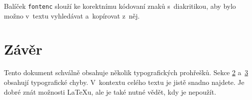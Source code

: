 \documentclass[twocolumn]{article}[23.02.2024]
\begin{document}
Balíček \texttt{fontenc} slouží ke korektnímu kódovaní znaků s~diakritikou, aby bylo možno v~textu vyhledávat a~kopírovat z~něj.

\section{Závěr}
Tento dokument schválně obsahuje několik typografických prohřešků.
Sekce \hyperref[sec:smisena_sazba]{2} a~\hyperref[sec:dalsi_rady]{3} obsahují typografické chyby.
V~kontextu celého textu je jistě snadno najdete.
Je dobré znát možnosti {\LaTeX}u, ale je také nutné vědět, kdy je nepoužít.
\end{document}
